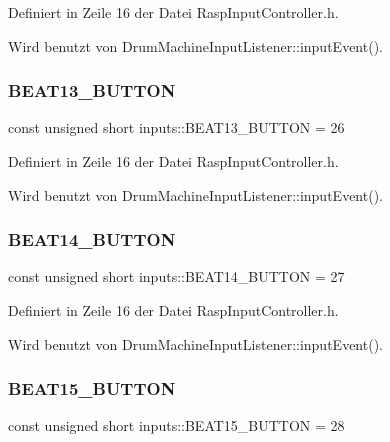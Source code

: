 Definiert in Zeile 16 der Datei Rasp\+Input\+Controller.\+h.



Wird benutzt von Drum\+Machine\+Input\+Listener\+::input\+Event().

\mbox{\label{namespaceinputs_a8f9d547eaa8c52cebfa64221341f266a}} 
\subsubsection{\texorpdfstring{B\+E\+A\+T13\+\_\+\+B\+U\+T\+T\+ON}{BEAT13\_BUTTON}}
{\footnotesize\ttfamily const unsigned short inputs\+::\+B\+E\+A\+T13\+\_\+\+B\+U\+T\+T\+ON = 26}



Definiert in Zeile 16 der Datei Rasp\+Input\+Controller.\+h.



Wird benutzt von Drum\+Machine\+Input\+Listener\+::input\+Event().

\mbox{\label{namespaceinputs_a4dfd34a5656f72c71f1b2dd8efc963dc}} 
\subsubsection{\texorpdfstring{B\+E\+A\+T14\+\_\+\+B\+U\+T\+T\+ON}{BEAT14\_BUTTON}}
{\footnotesize\ttfamily const unsigned short inputs\+::\+B\+E\+A\+T14\+\_\+\+B\+U\+T\+T\+ON = 27}



Definiert in Zeile 16 der Datei Rasp\+Input\+Controller.\+h.



Wird benutzt von Drum\+Machine\+Input\+Listener\+::input\+Event().

\mbox{\label{namespaceinputs_a1952aa2d27b65c8d8899a1ae1cfb7bb9}} 
\subsubsection{\texorpdfstring{B\+E\+A\+T15\+\_\+\+B\+U\+T\+T\+ON}{BEAT15\_BUTTON}}
{\footnotesize\ttfamily const unsigned short inputs\+::\+B\+E\+A\+T15\+\_\+\+B\+U\+T\+T\+ON = 28}



